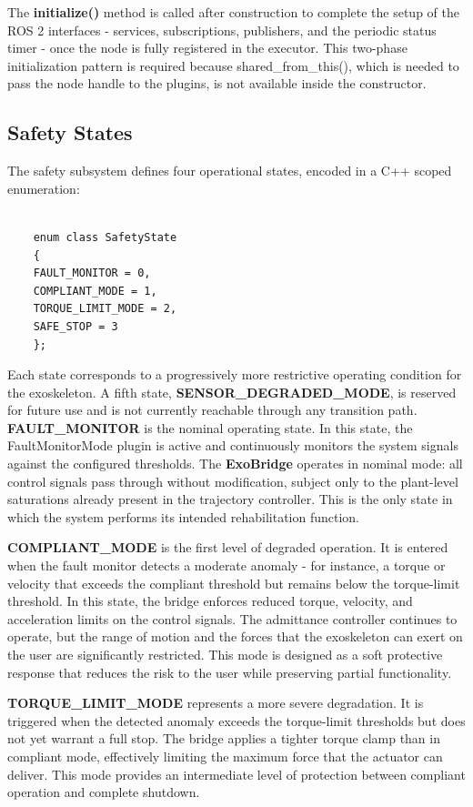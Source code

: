 The \textbf{initialize()} method is called after construction to complete the setup of the ROS 2 interfaces - services, subscriptions, publishers, and the periodic status timer - once the node is fully registered in the executor. This two-phase initialization pattern is required because shared\_from\_this(), which is needed to pass the node handle to the plugins, is not available inside the constructor.

\subsection{Safety States}
The safety subsystem defines four operational states, encoded in a C++ scoped enumeration:

\begin{verbatim}

    enum class SafetyState
    {
    FAULT_MONITOR = 0,
    COMPLIANT_MODE = 1,
    TORQUE_LIMIT_MODE = 2,
    SAFE_STOP = 3
    };

\end{verbatim}

Each state corresponds to a progressively more restrictive operating condition for the exoskeleton. A fifth state, \textbf{SENSOR\_DEGRADED\_MODE}, is reserved for future use and is not currently reachable through any transition path.
\textbf{FAULT\_MONITOR} is the nominal operating state. In this state, the FaultMonitorMode plugin is active and continuously monitors the system signals against the configured thresholds. The \textbf{ExoBridge} operates in nominal mode: all control signals pass through without modification, subject only to the plant-level saturations already present in the trajectory controller. This is the only state in which the system performs its intended rehabilitation function.

\textbf{COMPLIANT\_MODE} is the first level of degraded operation. It is entered when the fault monitor detects a moderate anomaly - for instance, a torque or velocity that exceeds the compliant threshold but remains below the torque-limit threshold. In this state, the bridge enforces reduced torque, velocity, and acceleration limits on the control signals. The admittance controller continues to operate, but the range of motion and the forces that the exoskeleton can exert on the user are significantly restricted. This mode is designed as a soft protective response that reduces the risk to the user while preserving partial functionality.

\textbf{TORQUE\_LIMIT\_MODE} represents a more severe degradation. It is triggered when the detected anomaly exceeds the torque-limit thresholds but does not yet warrant a full stop. The bridge applies a tighter torque clamp than in compliant mode, effectively limiting the maximum force that the actuator can deliver. This mode provides an intermediate level of protection between compliant operation and complete shutdown.
    
